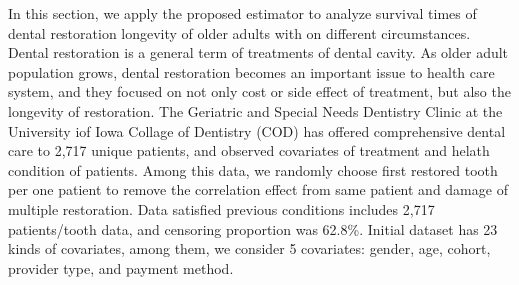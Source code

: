 \documentclass[titlepage,english,12pt]{article}
\begin{document}
	In this section, we apply the proposed estimator to analyze survival times of dental restoration longevity of older adults with on different circumstances.
	Dental restoration is a general term of treatments of dental cavity. As older adult population grows, dental restoration becomes an important issue to health care system, and they focused on not only cost or side effect of treatment, but also the longevity of restoration. The Geriatric and Special Needs Dentistry Clinic at the University iof Iowa Collage of Dentistry (COD) has offered comprehensive dental care to 2,717 unique patients, and observed covariates of treatment and helath condition of patients. Among this data, we randomly choose first restored tooth per one patient to remove the correlation effect from same patient and damage of multiple restoration. Data satisfied previous conditions includes 2,717 patients/tooth data, and censoring proportion was 62.8\%. Initial dataset has 23 kinds of covariates, among them, we consider 5 covariates: gender, age, cohort, provider type, and payment method. 

\end{document}
